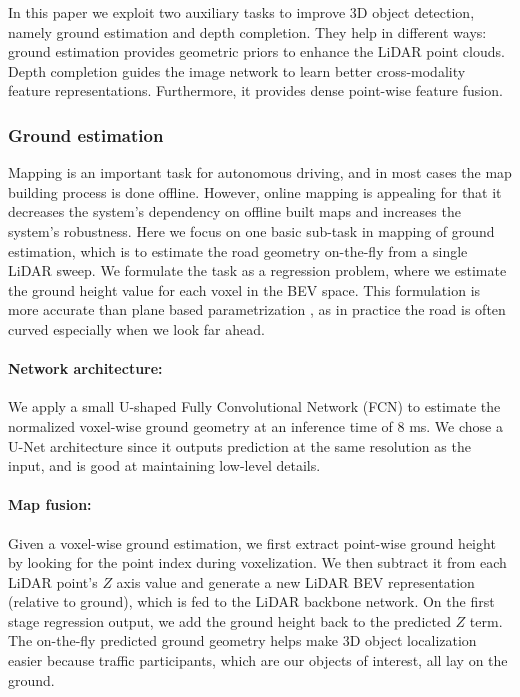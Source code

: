 \documentclass[10pt,twocolumn,letterpaper]{article}
\begin{document}
In this paper we exploit two auxiliary tasks to improve 3D object detection, namely ground estimation and depth completion. They help in different ways: ground estimation provides geometric  priors to enhance the LiDAR point clouds. Depth completion guides the image network to learn better cross-modality feature representations. Furthermore, it provides dense point-wise feature fusion.

\subsubsection{Ground estimation}
Mapping is an important task for autonomous driving, and in most cases the map building process is done offline. However, online mapping is appealing for that it decreases the system's dependency on offline built maps and increases the system's robustness. Here we focus on one basic sub-task in mapping of ground estimation, which is to estimate the road geometry on-the-fly from a single LiDAR sweep. We formulate the task as a regression problem, where we estimate the ground height value for each voxel in the BEV space. This formulation is more accurate than plane based parametrization \cite{3dop, birdnet}, as in practice the road is often   curved especially when we look far ahead.

\paragraph{Network architecture:}
We apply a small U-shaped Fully Convolutional Network (FCN) to estimate the normalized voxel-wise ground geometry at an inference time of 8 ms. We chose a U-Net architecture \cite{unet} since it outputs prediction at the same resolution as the input, and is good at maintaining low-level details.

\paragraph{Map fusion:}
Given a voxel-wise ground estimation, we first extract point-wise ground height by looking for the point index during voxelization. We then subtract it from each LiDAR point's $Z$ axis value and generate a new LiDAR BEV representation (relative to ground), which is fed to the LiDAR backbone network. On the first stage regression output, we add the ground height back to the predicted $Z$ term. The on-the-fly predicted ground geometry helps make 3D object localization easier because traffic participants, which are our objects of interest, all  lay on the ground.
\end{document}
